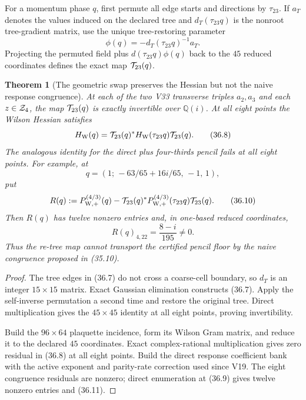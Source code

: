 \documentclass[11pt,oneside]{article}
\newtheorem{theorem}{Theorem}[section]
\theoremstyle{definition}
\theoremstyle{remark}
\begin{document}
For a momentum phase \(q\), first permute all edge starts and
directions by \(\tau_{23}\).  If \(a_T\) denotes the values induced
on the declared tree and \(d_T(\tau_{23}q)\) is the nonroot
tree-gradient matrix, use the unique tree-restoring parameter
\[
 \phi(q)=-d_T(\tau_{23}q)^{-1}a_T.                    \tag{36.7}
\]
Projecting the permuted field plus \(d(\tau_{23}q)\phi(q)\) back to
the \(45\) reduced coordinates defines the exact map
\({\cal T}_{23}(q)\).

\begin{theorem}[The geometric swap preserves the Hessian but not the
naive response congruence]
\label{thm:newv36-retree}
At each of the two V33 transverse triples \(a_2,a_3\) and each
\(z\in{\cal Z}_4\), the map \({\cal T}_{23}(q)\) is exactly
invertible over \(\mathbb Q(i)\).  At all eight points the Wilson
Hessian satisfies
\[
 H_{\mathrm W}(q)
 ={\cal T}_{23}(q)^*
  H_{\mathrm W}(\tau_{23}q){\cal T}_{23}(q).           \tag{36.8}
\]
The analogous identity for the direct plus four-thirds pencil fails
at all eight points.  For example, at
\[
 q=(1;\,-63/65+16i/65,\,-1,\,1),                      \tag{36.9}
\]
put
\[
 R(q):=P_{\mathrm W,+}^{(4/3)}(q)
 -{\cal T}_{23}(q)^*
  P_{\mathrm W,+}^{(4/3)}(\tau_{23}q)
  {\cal T}_{23}(q).                                   \tag{36.10}
\]
Then \(R(q)\) has twelve nonzero entries and, in one-based reduced
coordinates,
\[
 R(q)_{4,22}=\frac{8-i}{195}\ne0.                     \tag{36.11}
\]
Thus the re-tree map cannot transport the certified pencil floor by
the naive congruence proposed in (35.10).
\end{theorem}

\begin{proof}
The tree edges in (36.7) do not cross a coarse-cell boundary, so
\(d_T\) is an integer \(15\times15\) matrix.  Exact Gaussian
elimination constructs (36.7).  Apply the self-inverse permutation a
second time and restore the original tree.  Direct multiplication
gives the \(45\times45\) identity at all eight points, proving
invertibility.

Build the \(96\times64\) plaquette incidence, form its Wilson Gram
matrix, and reduce it to the declared \(45\) coordinates.  Exact
complex-rational multiplication gives zero residual in (36.8) at
all eight points.  Build the direct response coefficient bank with
the active exponent and parity-rate correction used since V19.
The eight congruence residuals are nonzero; direct enumeration at
(36.9) gives twelve nonzero entries and (36.11).
\end{proof}
\end{document}
